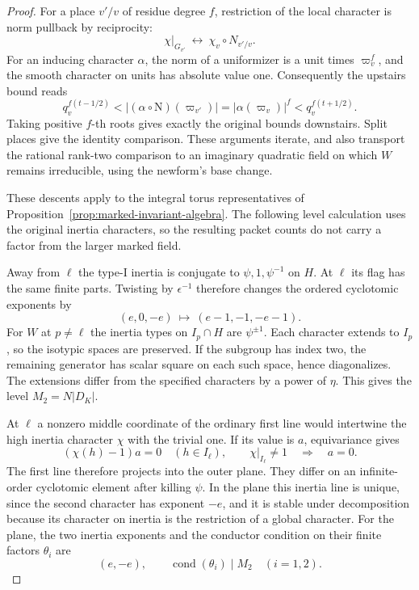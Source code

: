 \begin{proof}
For a place \(v'/v\) of residue degree \(f\), restriction of the local character is norm pullback by reciprocity:
\[
 \chi|_{G_{v'}}\ \longleftrightarrow\ \chi_v\circ N_{v'/v}.
\] For an inducing
character \(\alpha\), the norm of a uniformizer is a unit
times \(\varpi_v^f\), and the smooth character on units has
absolute value one. Consequently the upstairs bound reads
\[
 q_v^{f(t-1/2)}
   <|(\alpha\circ\mathrm N)(\varpi_{v'})|
      =|\alpha(\varpi_v)|^f
   <q_v^{f(t+1/2)} .
\]
Taking positive \(f\)-th roots gives exactly the original
bounds downstairs. Split places give the identity
comparison. These arguments iterate, and also transport
the rational rank-two comparison to an imaginary quadratic
field on which \(W\) remains irreducible, using the
newform's base change. \hfill\mbox{\cite{arthur-clozel,blggt-lg}}

These descents apply to the integral torus representatives
of Proposition~\ref{prop:marked-invariant-algebra}. The
following level calculation uses the original inertia
characters, so the resulting packet counts do not carry a
factor from the larger marked field.

Away from \(\ell\) the type-I inertia is conjugate to
\(\psi,1,\psi^{-1}\) on \(H\). At \(\ell\) its flag has the same finite parts. Twisting by
\(\epsilon^{-1}\) therefore changes the ordered cyclotomic exponents by
\[
             (e,0,-e)\ \longmapsto\ (e-1,-1,-e-1).
\] For \(W\) at \(p\ne\ell\) the inertia
types on \(I_p\cap H\) are \(\psi^{\pm1}\). Each character
extends to \(I_p\), so the isotypic spaces are preserved.
If the subgroup has index two, the remaining generator
has scalar square on each such space, hence diagonalizes.
The extensions differ from the specified characters by
a power of \(\eta\). This gives the level
\(M_2=N|D_K|\).

At \(\ell\) a nonzero middle coordinate of the ordinary first line would intertwine the high inertia character \(\chi\) with the trivial one. If its value is \(a\), equivariance gives
\[
 (\chi(h)-1)a=0\quad(h\in I_\ell),\qquad \chi|_{I_\ell}\ne1\quad\Longrightarrow\quad a=0 .
\]
The first line therefore projects into the outer plane. They differ on an infinite-order
cyclotomic element after killing \(\psi\). In the plane
this inertia line is unique, since the second character
has exponent \(-e\), and it is stable under decomposition
because its character on inertia is the restriction of a
global character. For the plane, the two inertia exponents and the conductor condition on their finite factors \(\theta_i\) are
\[
 (e,-e),\qquad \operatorname{cond}(\theta_i)\mid M_2\quad(i=1,2).
\]


\end{proof}
